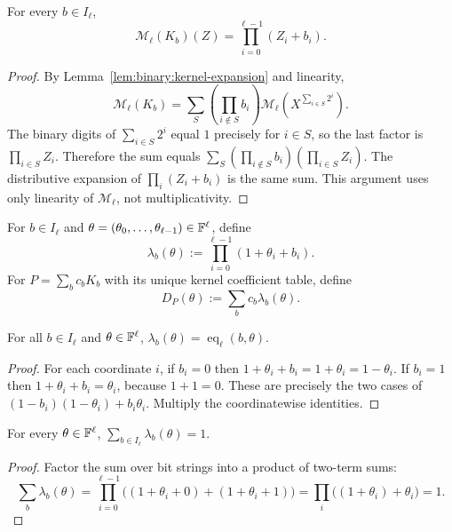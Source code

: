 \begin{lemma}\label{lem:binary:ml-kernel}
For every $b\in I_\ell$,
\[
 \boxed{\mathscr M_\ell(K_b)(Z)=\prod_{i=0}^{\ell-1}(Z_i+b_i).}
\]
\end{lemma}
\begin{proof}
By Lemma~\ref{lem:binary:kernel-expansion} and linearity,
\[
 \mathscr M_\ell(K_b)=\sum_{S}
   \left(\prod_{i\notin S}b_i\right)
   \mathscr M_\ell\left(X^{\sum_{i\in S}2^i}\right).
\]
The binary digits of $\sum_{i\in S}2^i$ equal $1$ precisely for
$i\in S$, so the last factor is $\prod_{i\in S}Z_i$.
Therefore the sum equals
$\sum_S(\prod_{i\notin S}b_i)(\prod_{i\in S}Z_i)$.
The distributive expansion of $\prod_i(Z_i+b_i)$ is the same sum.
This argument uses only linearity of $\mathscr M_\ell$,
not multiplicativity.
\end{proof}

\begin{definition}\label{def:binary:lambda}
For $b\in I_\ell$ and $\theta=(\theta_0,\ldots,\theta_{\ell-1})\in\mathbb{F}^\ell$,
define
\[
 \lambda_b(\theta):=\prod_{i=0}^{\ell-1}(1+\theta_i+b_i).
\]
For $P=\sum_bc_bK_b$ with its unique kernel coefficient table,
define
\[
 D_P(\theta):=\sum_bc_b\lambda_b(\theta).
\]
\end{definition}

\begin{lemma}\label{lem:binary:eq-weights}
For all $b\in I_\ell$ and $\theta\in\mathbb{F}^\ell$,
$\lambda_b(\theta)=\operatorname{eq}_\ell(b,\theta)$.
\end{lemma}
\begin{proof}
For each coordinate $i$, if $b_i=0$ then
$1+\theta_i+b_i=1+\theta_i=1-\theta_i$.
If $b_i=1$ then $1+\theta_i+b_i=\theta_i$,
because $1+1=0$. These are precisely the two cases of
$(1-b_i)(1-\theta_i)+b_i\theta_i$.
Multiply the coordinatewise identities.
\end{proof}

\begin{lemma}\label{lem:binary:lambda-partition}
For every $\theta\in\mathbb{F}^\ell$,
$\sum_{b\in I_\ell}\lambda_b(\theta)=1$.
\end{lemma}
\begin{proof}
Factor the sum over bit strings into a product of two-term sums:
\[
 \sum_b\lambda_b(\theta)
 =\prod_{i=0}^{\ell-1}
  \bigl((1+\theta_i+0)+(1+\theta_i+1)\bigr)
 =\prod_i\bigl((1+\theta_i)+\theta_i\bigr)=1.
\]
\end{proof}

